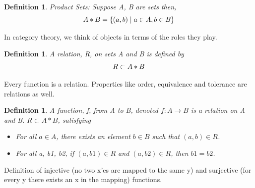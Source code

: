 \documentclass{article}
\newtheorem{defn}[thm]{Definition} %
\begin{document}
\begin{defn}
 Product Sets: Suppose A, B are sets then, \\
 \begin{equation*}
     A * B = \{ (a ,b) \mid a \in A, b \in B \} \\
 \end{equation*}
\end{defn} 
In category theory, we think of objects in terms of the roles they play. 
\begin{defn}
 A relation, R,  on sets A and B is defined by\\
 \begin{equation*}
     R \subset A * B \\
 \end{equation*}
\end{defn}
Every function is a relation. Properties like order, equivalence and tolerance are relations as well. 
\begin{defn}
 A function, f, from A to B, denoted $f: A \rightarrow B$ is a relation on A and B. $R \subset A * B$, satisfying 
 \begin{itemize}
     \item For all $a \in A$, there exists an element $b \in B$ such that $(a, b) \in R$. \\
     \item For all a, b1, b2, if $(a, b1) \in R$ and $(a, b2) \in R$, then $b1 = b2$. \\ 
\end{itemize}
\end{defn}
Definition of injective (no two x'es are mapped to the same y) and surjective (for every y there exists an x in the mapping) functions. \\
\end{document}
